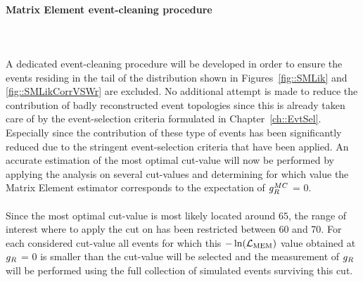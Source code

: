 \paragraph{Matrix Element event-cleaning procedure} \hfill \\
\\
A dedicated event-cleaning procedure will be developed in order to ensure the events residing in the tail of the distribution shown in Figures~\ref{fig::SMLik} and \ref{fig::SMLikCorrVSWr} are excluded.
No additional attempt is made to reduce the contribution of badly reconstructed event topologies since this is already taken care of by the event-selection criteria formulated in Chapter~\ref{ch::EvtSel}.
Especially since the contribution of these type of events has been significantly reduced due to the stringent event-selection criteria that have been applied.
An accurate estimation of the most optimal cut-value will now be performed by applying the analysis on several cut-values and determining for which value the Matrix Element estimator corresponds to the expectation of $g_{R}^{MC}$ = 0.
\\
\\
Since the most optimal cut-value is most likely located around $65$, the range of interest where to apply the cut on has been restricted between 60 and 70.
For each considered cut-value all events for which this $-\ln(\mathcal{L}_{\textrm{MEM}})$ value obtained at $g_{R}$ = 0 is smaller than the cut-value will be selected and the measurement of $g_{R}$ will be performed using the full collection of simulated events surviving this cut.
